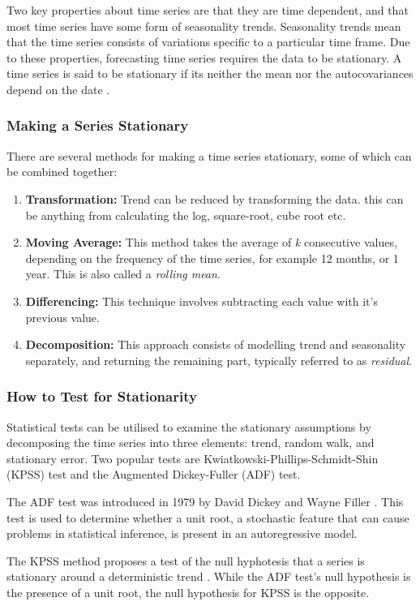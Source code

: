 \documentclass{UoYCSproject}
\begin{document}
Two key properties about time series are that they are time dependent, and that most time series have some form of seasonality trends. Seasonality trends mean that the time series consists of variations specific to a particular time frame. Due to these properties, forecasting time series requires the data to be stationary. A time series is said to be stationary if its neither the mean nor the autocovariances depend on the date \cite{hamilton1994time}. 

\subsubsection{Making a Series Stationary}
There are several methods for making a time series stationary, some of which can be combined together:
\begin{enumerate}
    \item \textbf{Transformation:} Trend can be reduced by transforming the data. this can be anything from calculating the log, square-root, cube root etc.  
    \item \textbf{Moving Average:} This method takes the average of \textit{k} consecutive values, depending on the frequency of the time series, for example 12 months, or 1 year. This is also called a \textit{rolling mean}. 
    \item \textbf{Differencing:} This technique involves subtracting each value with it's previous value.
    \item \textbf{Decomposition:} This approach consists of modelling trend and seasonality separately, and returning the remaining part, typically referred to as \textit{residual}. 
\end{enumerate}

\subsubsection{How to Test for Stationarity}
Statistical tests can be utilised to examine the stationary assumptions by decomposing the time series into three elements: trend, random walk, and stationary error. Two popular tests are Kwiatkowski-Phillips-Schmidt-Shin (KPSS) test and the Augmented Dickey-Fuller (ADF) test.

The ADF test was introduced in 1979 by David Dickey and Wayne Filler \cite{dickey1979distribution}. This test is used to determine whether a unit root, a stochastic feature that can cause problems in statistical inference, is present in an autoregressive model. 

The KPSS method proposes a test of the null hyphotesis that a series is stationary around a deterministic trend \cite{kwiatkowski1992testing}. While the ADF test's null hypothesis is the presence of a unit root, the null hypothesis for KPSS is the opposite. 

\printbibliography
\end{document}
